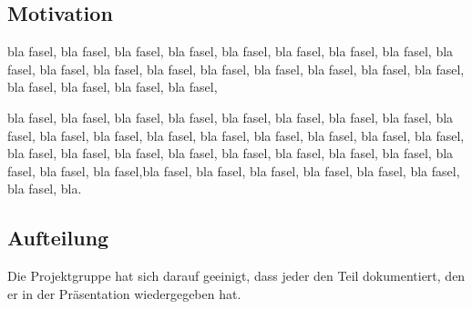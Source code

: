 \subsection{Motivation}
bla fasel, bla fasel, bla fasel, bla fasel, bla fasel, bla fasel, bla fasel, bla fasel, bla fasel, bla fasel, bla fasel, bla fasel, bla fasel, bla fasel, bla fasel, bla fasel, bla fasel, bla fasel, bla fasel, bla fasel, bla fasel, 



bla fasel, bla fasel, bla fasel, bla fasel, bla fasel, bla fasel, bla fasel, bla fasel, bla fasel, bla fasel, bla fasel, bla fasel, bla fasel, bla fasel, bla fasel, bla fasel, bla fasel, bla fasel, bla fasel, bla fasel, bla fasel, bla fasel, bla fasel, bla fasel, bla fasel, bla fasel, bla fasel, bla fasel,bla fasel, bla fasel, bla fasel, bla fasel, bla fasel, bla fasel, bla fasel, bla.

\subsection{Aufteilung}
Die Projektgruppe hat sich darauf geeinigt, dass jeder den Teil dokumentiert, den er in der Präsentation wiedergegeben hat.